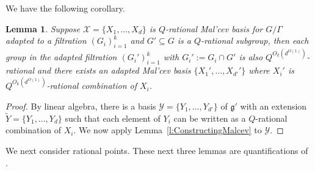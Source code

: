 \documentclass[11pt, a4paper]{amsart}
\theoremstyle{plain}
\theoremstyle{plain}
\newtheorem{lemma}{Lemma}
\theoremstyle{definition}
\theoremstyle{remark}
\numberwithin{equation}{section}
\numberwithin{lemma}{section}
\numberwithin{proposition}{section}
\numberwithin{corollary}{section}
\numberwithin{definition}{section}
\numberwithin{claim}{section}
\begin{document}
We have the following corollary.
\begin{lemma}\label{l:Subgroupfiltration}
Suppose $\mathcal{X} = \{X_1, \dots, X_d\}$ is $Q$-rational Mal'cev basis for $G/\Gamma$ adapted to a filtration $(G_i)_{i = 1}^k$ and $G' \subseteq G$ is a $Q$-rational subgroup, then each group in the adapted filtration $(G_i')_{i = 1}^k$ with $G_i' := G_i \cap G'$ is also $Q^{O_k(d^{O(1)})}$-rational and there exists an adapted Mal'cev basis $\{X_1', \dots, X_{d'}'\}$ where $X_i'$ is $Q^{O_k(d^{O(1)})}$-rational combination of $X_i$.
\end{lemma}
\begin{proof}
By linear algebra, there is a basis $\mathcal{Y} = \{Y_1, \dots, Y_{d'}\}$ of $\mathfrak{g}'$ with an extension $\tilde{Y} = \{Y_1, \dots, Y_d\}$ such that each element of $Y_i$ can be written as a $Q$-rational combination of $X_i$. We now apply Lemma~\ref{l:ConstructingMalcev} to $\mathcal{Y}$.
\end{proof}

We next consider rational points. These next three lemmas are quantifications of \cite[Lemma A.11-A.13]{GT12}.
\end{document}
